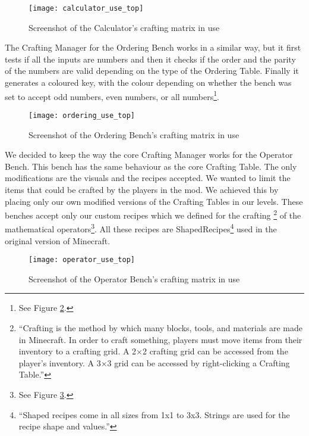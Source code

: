 \begin{figure}[H]
\label{fig:ssot-calculator}
\caption{Screenshot of the Calculator's crafting matrix in use}
\centering
\texttt{[image: calculator\_use\_top]}
\end{figure}

The Crafting Manager for the Ordering Bench works in a similar way, but it first tests if all the inputs are numbers and then it checks if the order and the parity of the numbers are valid depending on the type of the Ordering Table.
Finally it generates a coloured key, with the colour depending on whether the bench was set to accept odd numbers,
even numbers, or all numbers\footnote{See Figure \ref{fig:ssot-ordering}.}.

\begin{figure}[H]
\label{fig:ssot-ordering}
\caption{Screenshot of the Ordering Bench's crafting matrix in use}
\centering
\texttt{[image: ordering\_use\_top]}
\end{figure}

We decided to keep the way the core Crafting Manager works for the Operator Bench. This bench has the same behaviour as the core Crafting Table. The only modifications are the visuals and the recipes accepted. We wanted to limit the items that could be crafted by the players in the mod. We achieved this by placing only our own modified versions of the Crafting Tables in our levels. These benches accept only our custom recipes which we defined for the crafting \footnote{``Crafting is the method by which many blocks, tools, and materials are made in Minecraft. In order to craft something, players must move items from their inventory to a crafting grid. A 2×2 crafting grid can be accessed from the player's inventory. A 3×3 grid can be accessed by right-clicking a Crafting Table.''} of the mathematical operators\footnote{See Figure \ref{fig:ssot-operators}.}.
All these recipes are ShapedRecipes\footnote{``Shaped recipes come in all sizes from 1x1 to 3x3. Strings are used for the recipe shape and values.''\cite{website:forge-shaped}} used in the original version of Minecraft.

\begin{figure}[H]
\label{fig:ssot-operators}
\caption{Screenshot of the Operator Bench's crafting matrix in use}
\centering
\texttt{[image: operator\_use\_top]}
\end{figure}

